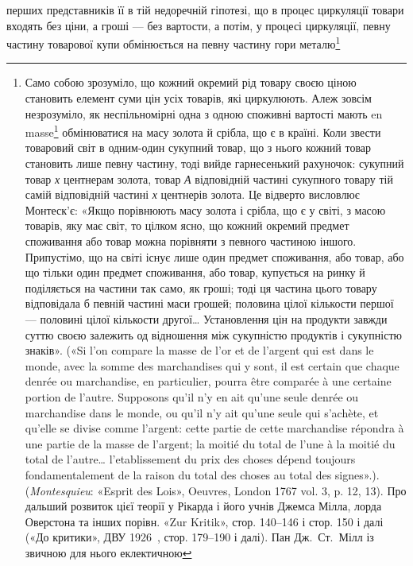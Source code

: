 \parcont{}  %
перших представників її в тій недоречній гіпотезі, що в процес
циркуляції товари входять без ціни, а гроші — без вартости, а
потім, у процесі циркуляції, певну частину товарової купи обмінюється
на певну частину гори металю\footnote{
Само собою зрозуміло, що кожний окремий рід товару своєю ціною
становить елемент суми цін усіх товарів, які циркулюють. Алеж зовсім
незрозуміло, як неспільномірні одна з одною споживні вартості мають
en masse\footnote*{
всією масою. \emph{Ред.}
} обмінюватися на масу золота й срібла, що є в країні. Коли
звести товаровий світ в одним-один сукупний товар, що з нього кожний
товар становить лише певну частину, тоді вийде гарнесенький рахуночок:
сукупний товар \deq{} \emph{х} центнерам золота, товар \emph{А} \deq{} відповідній частині
сукупного товару \deq{} тій самій відповідній частині \emph{х} центнерів золота. Це
відверто висловлює Монтеск’є: «Якщо порівнюють масу золота і срібла,
що є у світі, з масою товарів, яку має світ, то цілком ясно, що кожний
окремий предмет споживання або товар можна порівняти з певного частиною
іншого. Припустімо, що на світі існує лише один предмет споживання,
або товар, або що тільки один предмет споживання, або товар, купується
на ринку й поділяється на частини так само, як гроші; тоді ця частина
цього товару відповідала б певній частині маси грошей; половина цілої
кількости першої — половині цілої кількости другої\dots{} Установлення цін
на продукти завжди суттю своєю залежить од відношення між сукупністю
продуктів і сукупністю знаків». («Si l’on compare la masse de l’or et
de l’argent qui est dans le monde, avec la somme des marchandises qui y
sont, il est certain que chaque denrée ou marchandise, en particulier, pourra
être comparée à une certaine portion de l’autre. Supposons qu’il n’y en ait
qu’une seule denrée ou marchandise dans le monde, ou qu’il n’y ait qu’une
seule qui s’achète, et qu’elle se divise comme l’argent: cette partie de cette marchandise
répondra à une partie de la masse de l’argent; la moitié du total
de l’une à la moitié du total de l’autre\dots{} l’etablissement du prix des choses
dépend toujours fondamentalement de la raison du total des choses au
total des signes».). (\emph{Montesquieu}: «Esprit des Lois», Oeuvres, London
1767 vol. 3, p. 12, 13). Про дальший розвиток цієї теорії у Рікарда
і його учнів Джемса Мілла, лорда Оверстона та інших порівн. «Zur
Kritik», стор. 140--146 і стор. 150 і далі («До критики», ДВУ 1926~,
стор. 179--190 і далі). Пан Дж.~Ст.~Мілл із звичною для нього еклектичною
}

